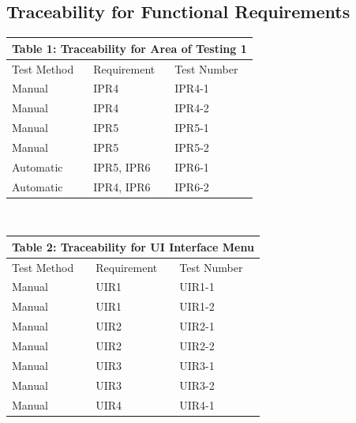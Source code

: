 \documentclass[12pt, titlepage]{article}
\begin{document}
\subsection{Traceability for Functional Requirements}
\begin{tabular}{|p{}|p{}|p{}|}

\hline \multicolumn{3}{|c|}{Table 1: Traceability for Area of Testing 1}\\

\hline Test Method&Requirement&Test Number\\

\hline Manual&IPR4&IPR4-1\\

\hline Manual&IPR4&IPR4-2\\

\hline Manual&IPR5&IPR5-1\\

\hline Manual&IPR5&IPR5-2\\

\hline Automatic&IPR5, IPR6&IPR6-1\\

\hline Automatic&IPR4, IPR6&IPR6-2\\

\hline

\end{tabular}
\\
\begin{tabular}{|p{}|p{}|p{}|}

\hline \multicolumn{3}{|c|}{Table 2: Traceability for UI Interface Menu}\\

\hline Test Method&Requirement&Test Number\\

\hline Manual&UIR1&UIR1-1\\

\hline Manual&UIR1&UIR1-2\\

\hline Manual&UIR2&UIR2-1\\

\hline Manual&UIR2&UIR2-2\\

\hline Manual&UIR3&UIR3-1\\

\hline Manual&UIR3&UIR3-2\\

\hline Manual&UIR4&UIR4-1\\

\hline

\end{tabular}
\end{document}
